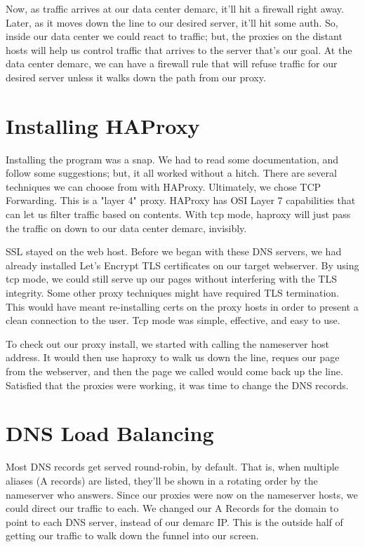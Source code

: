 Now, as traffic arrives at our data center demarc, it'll hit a \gls{firewall} right away.  Later, as it moves down the line to our desired server, it'll hit some auth.  So, inside our data center we could react to traffic; but, the proxies on the distant hosts will help us control traffic that arrives to the server that's our goal.  At the data center demarc, we can have a \gls{firewall} rule that will refuse traffic for our desired server unless it walks down the path from our proxy.

\section{Installing HAProxy}


Installing the program was a snap.  We had to read some documentation, and follow some suggestions; but, it all worked without a hitch.  There are several techniques we can choose from with HAProxy.  Ultimately, we chose 
TCP Forwarding.  This is a "layer 4" proxy.  HAProxy has OSI Layer 7 capabilities that can let us filter traffic based on contents.  With tcp mode, haproxy will just pass the traffic on down to our data center demarc, invisibly.

SSL stayed on the web host.  Before we began with these DNS servers, we had already installed Let's Encrypt TLS \gls{certificate}s on our target webserver.  By using tcp mode, we could still serve up our pages without interfering with the TLS integrity.  Some other proxy techniques might have required TLS termination.  This would have meant re-installing certs on the proxy hosts in order to present a clean connection to the user.  Tcp mode was simple, effective, and easy to use.

To check out our proxy install, we started with calling the nameserver host address.  It would then use haproxy to walk us down the line, reques our page from the webserver, and then the page we called would come back up the line.  Satisfied that the proxies were working, it was time to change the DNS records.

\section{DNS Load Balancing}


Most DNS records get served round-robin, by default.  That is, when multiple aliases (A records) are listed, they'll be shown in a rotating order by the nameserver who answers.  Since our proxies were now on the nameserver hosts, we could direct our traffic to each.  We changed our A Records for the domain to point to each DNS server, instead of our demarc IP.  This is the outside half of getting our traffic to walk down the funnel into our screen.  


